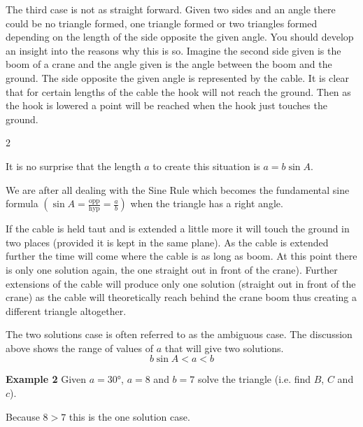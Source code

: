 The third case is not as straight forward. Given two sides and an angle there could be no triangle formed, one triangle formed or two triangles formed depending on the length of the side opposite the given angle. You should develop an insight into the reasons why this is so. Imagine the second side given is the boom of a crane and the angle given is the angle between the boom and the ground. The side opposite the given angle is represented by the cable. It is clear that for certain lengths of the cable the hook will not reach the ground. Then as the hook is lowered a point will be reached when the hook just touches the ground.  

\columnsep =30pt
\begin {multicols}{2}
\setlength\fboxrule{0in}\setlength\fboxsep{0.2in}

It is no surprise that the length $a$ to create this situation is $a =b \sin  A\text{.}$ 

We are after all dealing with the Sine Rule which becomes the fundamental sine formula $\left (\sin  A =\frac{\text{opp}}{\text{hyp}} =\frac{a}{b}\right )$ when the triangle has a right angle. 
\end {multicols}

If the cable is held taut and is extended a little more it will touch the ground in two places (provided it is kept in the same plane). As the cable is extended further the time will come where the cable is as long as boom. At this point there is only one solution again, the one straight out in front of the crane). Further extensions of the cable will produce only one solution (straight out in front of the crane) as the cable will theoretically reach behind the crane boom thus creating a different triangle altogether. 

The two solutions case is often referred to as the ambiguous case. The discussion above shows the range of values of $a$ that will give two solutions.
\begin{equation*}b \sin  A <a <b
\end{equation*}

\textbf{Example 2} Given $a =\ang{30} $, $a =8$ and $b =7$ solve the triangle (i.e. find $B$, $C$ and $c$).    
\setlength\fboxrule{0in}\setlength\fboxsep{0.2in}

Because $8 >7$ this is the one solution case. 

